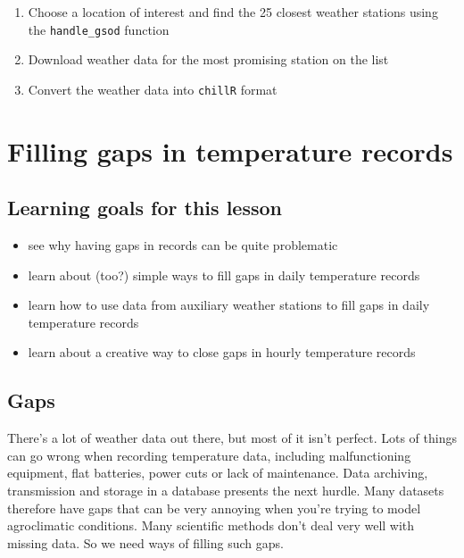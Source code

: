 \documentclass[
]{book}
\providecommand{\tightlist}{%
  \setlength{\itemsep}{0pt}\setlength{\parskip}{0pt}}
\begin{document}
\begin{enumerate}
\def\labelenumi{\arabic{enumi})}
\tightlist
\item
  Choose a location of interest and find the 25 closest weather stations using the \texttt{handle\_gsod} function
\item
  Download weather data for the most promising station on the list
\item
  Convert the weather data into \texttt{chillR} format
\end{enumerate}

\hypertarget{filling-gaps-in-temperature-records}{%
\chapter{Filling gaps in temperature records}\label{filling-gaps-in-temperature-records}}

\hypertarget{goals_gaps}{%
\section*{Learning goals for this lesson}\label{goals_gaps}}

\begin{itemize}
\tightlist
\item
  see why having gaps in records can be quite problematic
\item
  learn about (too?) simple ways to fill gaps in daily temperature records
\item
  learn how to use data from auxiliary weather stations to fill gaps in daily temperature records
\item
  learn about a creative way to close gaps in hourly temperature records
\end{itemize}

\hypertarget{gaps}{%
\section{Gaps}\label{gaps}}

There's a lot of weather data out there, but most of it isn't perfect. Lots of things can go wrong when recording temperature data, including malfunctioning equipment, flat batteries, power cuts or lack of maintenance. Data archiving, transmission and storage in a database presents the next hurdle. Many datasets therefore have gaps that can be very annoying when you're trying to model agroclimatic conditions. Many scientific methods don't deal very well with missing data. So we need ways of filling such gaps.
\end{document}
